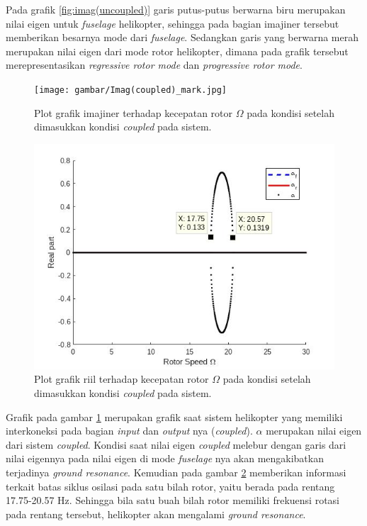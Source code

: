 Pada grafik \ref{fig:imag(uncoupled)} garis putus-putus berwarna biru merupakan nilai eigen untuk \textit{fuselage} helikopter, sehingga pada bagian imajiner tersebut memberikan besarnya mode dari \textit{fuselage}. Sedangkan garis yang berwarna merah merupakan nilai eigen dari mode rotor helikopter, dimana pada grafik tersebut merepresentasikan \textit{regressive rotor mode} dan \textit{progressive rotor mode}. 

\begin{figure}[H]
	\centering
	\texttt{[image: gambar/Imag(coupled)\_mark.jpg]}
	\caption{Plot grafik imajiner terhadap kecepatan rotor $\Omega$ pada kondisi setelah dimasukkan kondisi \textit{coupled} pada sistem.}
	\label{fig:imag(coupled)}
\end{figure}

\begin{figure}[H]
	\centering
	\includegraphics[width=0.7\linewidth]{gambar/Real(coupled).jpg}
	\caption{Plot grafik riil terhadap kecepatan rotor $\Omega$ pada kondisi setelah dimasukkan kondisi \textit{coupled} pada sistem.}
	\label{fig:real(coupled)}
\end{figure}

Grafik pada gambar \ref{fig:imag(coupled)} merupakan grafik saat sistem helikopter yang memiliki interkoneksi pada bagian \textit{input} dan \textit{output} nya (\textit{coupled}). $\alpha$ merupakan nilai eigen dari sistem \textit{coupled}. Kondisi saat nilai eigen \textit{coupled} melebur dengan garis dari nilai eigennya pada nilai eigen di mode \textit{fuselage} nya akan mengakibatkan terjadinya \textit{ground resonance}. Kemudian pada gambar \ref{fig:real(coupled)} memberikan informasi terkait batas siklus osilasi pada satu bilah rotor, yaitu berada pada rentang 17.75-20.57 Hz. Sehingga bila satu buah bilah rotor memiliki frekuensi rotasi pada rentang tersebut, helikopter akan mengalami \textit{ground resonance}.

